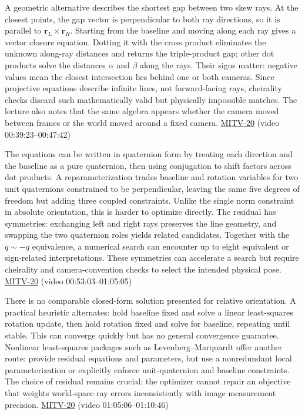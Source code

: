 A geometric alternative describes the shortest gap between two skew rays. At the closest points, the gap vector is perpendicular to both ray directions, so it is parallel to \(\mathbf{r}_L\times\mathbf{r}_R\). Starting from the baseline and moving along each ray gives a vector closure equation. Dotting it with the cross product eliminates the unknown along-ray distances and returns the triple-product gap; other dot products solve the distances \(\alpha\) and \(\beta\) along the rays. Their signs matter: negative values mean the closest intersection lies behind one or both cameras. Since projective equations describe infinite lines, not forward-facing rays, cheirality checks discard such mathematically valid but physically impossible matches. The lecture also notes that the same algebra appears whether the camera moved between frames or the world moved around a fixed camera. \hyperref[04-visual-computing-ii-ch036-mitv-20---space-of-rotations-regular-tessellations-critical-surfaces-binocular-stereo]{MITV-20} (video 00:39:23--00:47:42)

The equations can be written in quaternion form by treating each direction and the baseline as a pure quaternion, then using conjugation to shift factors across dot products. A reparameterization trades baseline and rotation variables for two unit quaternions constrained to be perpendicular, leaving the same five degrees of freedom but adding three coupled constraints. Unlike the single norm constraint in absolute orientation, this is harder to optimize directly. The residual has symmetries: exchanging left and right rays preserves the line geometry, and swapping the two quaternion roles yields related candidates. Together with the \(q\sim -q\) equivalence, a numerical search can encounter up to eight equivalent or sign-related interpretations. These symmetries can accelerate a search but require cheirality and camera-convention checks to select the intended physical pose. \hyperref[04-visual-computing-ii-ch036-mitv-20---space-of-rotations-regular-tessellations-critical-surfaces-binocular-stereo]{MITV-20} (video 00:53:03--01:05:05)

There is no comparable closed-form solution presented for relative orientation. A practical heuristic alternates: hold baseline fixed and solve a linear least-squares rotation update, then hold rotation fixed and solve for baseline, repeating until stable. This can converge quickly but has no general convergence guarantee. Nonlinear least-squares packages such as Levenberg--Marquardt offer another route: provide residual equations and parameters, but use a nonredundant local parameterization or explicitly enforce unit-quaternion and baseline constraints. The choice of residual remains crucial; the optimizer cannot repair an objective that weights world-space ray errors inconsistently with image measurement precision. \hyperref[04-visual-computing-ii-ch036-mitv-20---space-of-rotations-regular-tessellations-critical-surfaces-binocular-stereo]{MITV-20} (video 01:05:06--01:10:46)

